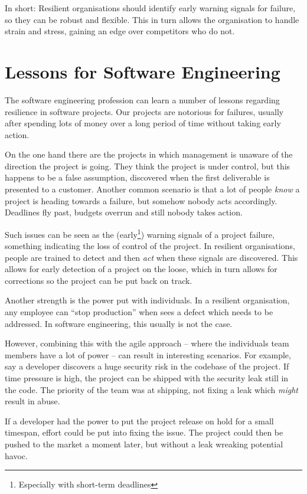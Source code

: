 In short: Resilient organisations should identify early warning signals for failure, so they can be robust and flexible.
This in turn allows the organisation to handle strain and stress, gaining an edge over competitors who do not.

\section{Lessons for Software Engineering}
The software engineering profession can learn a number of lessons regarding resilience in software projects.
Our projects are notorious for failures, usually after spending lots of money over a long period of time without taking early action. 

On the one hand there are the projects in which management is unaware of the direction the project is going. 
They think the project is under control, but this happens to be a false assumption, discovered when the first deliverable is presented to a customer. 
Another common scenario is that a lot of people \emph{know} a project is heading towards a failure, but somehow nobody acts accordingly. 
Deadlines fly past, budgets overrun and still nobody takes action.

Such issues can be seen as the (early\footnote{Especially with short-term deadlines}) warning signals of a project failure, something indicating the loss of control of the project. 
In resilient organisations, people are trained to detect and then \emph{act} when these signals are discovered. 
This allows for early detection of a project on the loose, which in turn allows for corrections so the project can be put back on track.

Another strength is the power put with individuals. 
In a resilient organisation, any employee can ``stop production'' when sees a defect which needs to be addressed. 
In software engineering, this usually is not the case.

However, combining this with the agile approach -- where the individuals team members have a lot of power -- can result in interesting scenarios. 
For example, say a developer discovers a huge security risk in the codebase of the project.
If time pressure is high, the project can be shipped with the security leak still in the code. 
The priority of the team was at shipping, not fixing a leak which \emph{might} result in abuse.

If a developer had the power to put the project release on hold for a small timespan, effort could be put into fixing the issue. 
The project could then be pushed to the market a moment later, but without a leak wreaking potential havoc.

